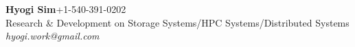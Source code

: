 {\textbf{\Large Hyogi Sim}\hfill{\small +1-540-391-0202}}\\
{\small
{Research \& Development on Storage Systems/HPC Systems/Distributed Systems}
    \hfill{\emph{\small hyogi.work@gmail.com}}\\
}
